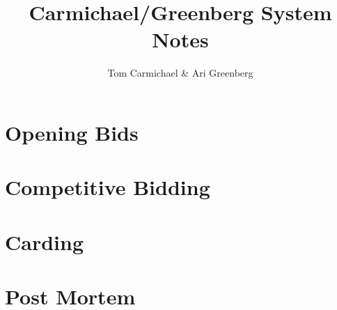 \documentclass[letterpaper,11pt,oneside]{memoir}
\author{Tom Carmichael \& Ari Greenberg}
\begin{document}
\frontmatter


\title{Carmichael/Greenberg System Notes}
\maketitle
\tableofcontents

\mainmatter


\part{Opening Bids}













\part{Competitive Bidding}



\part{Carding}

\part{Post Mortem}

\backmatter
\end{document}
